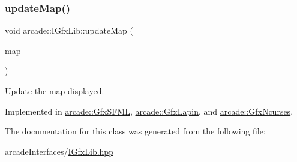 \mbox{\label{classarcade_1_1_i_gfx_lib_addc883f69b75e6ec4927027aad94f5b5}} 
\subsubsection{\texorpdfstring{update\+Map()}{updateMap()}}
{\footnotesize\ttfamily void arcade\+::\+I\+Gfx\+Lib\+::update\+Map (\begin{DoxyParamCaption}\item[{\hyperlink{classarcade_1_1_i_map}{I\+Map} const \&}]{map }\end{DoxyParamCaption})\hspace{0.3cm}{\ttfamily [pure virtual]}}



Update the map displayed. 



Implemented in \hyperlink{classarcade_1_1_gfx_s_f_m_l_ad21d26a1e549e2da25da1c9f4155151c}{arcade\+::\+Gfx\+S\+F\+ML}, \hyperlink{classarcade_1_1_gfx_lapin_a06f4eb48bd1ea7749d81870211115a46}{arcade\+::\+Gfx\+Lapin}, and \hyperlink{classarcade_1_1_gfx_ncurses_a4e02400d983845ebe37f374f3dd82793}{arcade\+::\+Gfx\+Ncurses}.



The documentation for this class was generated from the following file\+:\begin{DoxyCompactItemize}
\item 
arcade\+Interfaces/\hyperlink{_i_gfx_lib_8hpp}{I\+Gfx\+Lib.\+hpp}\end{DoxyCompactItemize}
